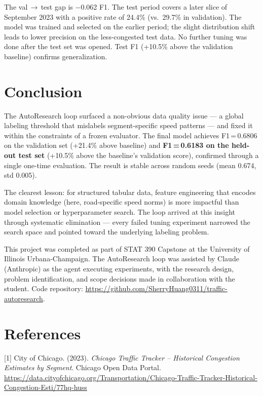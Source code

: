 \documentclass{article}
\begin{document}
The val\,$\to$\,test gap is $-$0.062 F1. The test period covers a later slice of September 2023 with a
positive rate of 24.4\% (vs.\ 29.7\% in validation). The model was trained and selected
on the earlier period; the slight distribution shift leads to lower precision on the
less-congested test data. No further tuning was done after the test set was opened.
Test F1 (+10.5\% above the validation baseline) confirms generalization.

\section{Conclusion}

The AutoResearch loop surfaced a non-obvious data quality issue — a global labeling
threshold that mislabels segment-specific speed patterns — and fixed it within the
constraints of a frozen evaluator. The final model achieves F1\,=\,0.6806 on the
validation set (+21.4\% above baseline) and \textbf{F1\,=\,0.6183 on the held-out test set}
(+10.5\% above the baseline's validation score), confirmed through a single one-time evaluation.
The result is stable across random seeds (mean 0.674, std 0.005).

The clearest lesson: for structured tabular data, feature engineering that encodes
domain knowledge (here, road-specific speed norms) is more impactful than model
selection or hyperparameter search. The loop arrived at this insight through systematic
elimination — every failed tuning experiment narrowed the search space and pointed
toward the underlying labeling problem.

\begin{ack}
This project was completed as part of STAT 390 Capstone at the University of Illinois
Urbana-Champaign. The AutoResearch loop was assisted by Claude (Anthropic) as the
agent executing experiments, with the research design, problem identification, and
scope decisions made in collaboration with the student. Code repository:
\url{https://github.com/SherryHuang0311/traffic-autoresearch}.
\end{ack}

\section*{References}

\small

[1] City of Chicago. (2023). \textit{Chicago Traffic Tracker -- Historical Congestion
Estimates by Segment}. Chicago Open Data Portal.
\url{https://data.cityofchicago.org/Transportation/Chicago-Traffic-Tracker-Historical-Congestion-Esti/77hq-huss}
\end{document}
